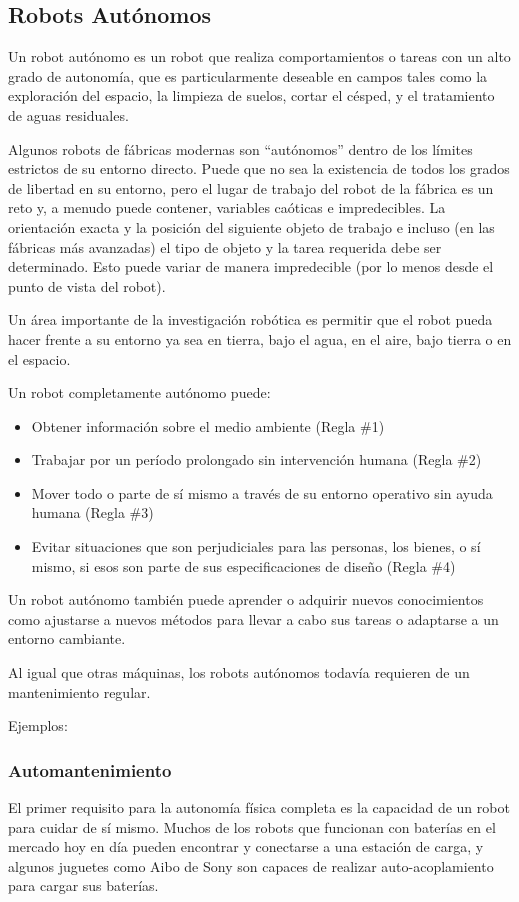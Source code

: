 \subsection{Robots Autónomos}
Un robot autónomo es un robot que realiza comportamientos o tareas con un alto grado de autonomía, que es particularmente deseable en campos tales como la exploración del espacio, la limpieza de suelos, cortar el césped, y el tratamiento de aguas residuales.

Algunos robots de fábricas modernas son ``autónomos'' dentro de los límites estrictos de su entorno directo. Puede que no sea la existencia de todos los grados de libertad en su entorno, pero el lugar de trabajo del robot de la fábrica es un reto y, a menudo puede contener, variables caóticas e impredecibles. La orientación exacta y la posición del siguiente objeto de trabajo e incluso (en las fábricas más avanzadas) el tipo de objeto y la tarea requerida debe ser determinado. Esto puede variar de manera impredecible (por lo menos desde el punto de vista del robot).

Un área importante de la investigación robótica es permitir que el robot pueda hacer frente a su entorno ya sea en tierra, bajo el agua, en el aire, bajo tierra o en el espacio.

Un robot completamente autónomo puede:

\begin{itemize}
	\itemsep1pt \parskip1pt 
	\item Obtener información sobre el medio ambiente (Regla \#1)
	\item Trabajar por un período prolongado sin intervención humana (Regla \#2)
	\item Mover todo o parte de sí mismo a través de su entorno operativo sin ayuda humana (Regla \#3)
	\item Evitar situaciones que son perjudiciales para las personas, los bienes, o sí mismo, si esos son parte de sus especificaciones de diseño (Regla \#4)
\end{itemize}

Un robot autónomo también puede aprender o adquirir nuevos conocimientos como ajustarse a nuevos métodos para llevar a cabo sus tareas o adaptarse a un entorno cambiante.

Al igual que otras máquinas, los robots autónomos todavía requieren de un mantenimiento regular.

Ejemplos:

\subsubsection{Automantenimiento}
El primer requisito para la autonomía física completa es la capacidad de un robot para cuidar de sí mismo. Muchos de los robots que funcionan con baterías en el mercado hoy en día pueden encontrar y conectarse a una estación de carga, y algunos juguetes como Aibo de Sony son capaces de realizar auto-acoplamiento para cargar sus baterías.

